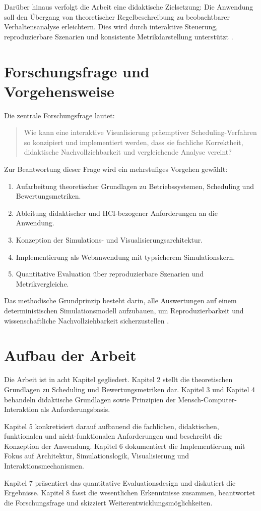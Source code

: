 Darüber hinaus verfolgt die Arbeit eine didaktische Zielsetzung: Die Anwendung soll den Übergang von theoretischer Regelbeschreibung zu beobachtbarer Verhaltensanalyse erleichtern. Dies wird durch interaktive Steuerung, reproduzierbare Szenarien und konsistente Metrikdarstellung unterstützt \cite{hundhausen2002meta,naps2002engagement}.

\section{Forschungsfrage und Vorgehensweise}

Die zentrale Forschungsfrage lautet:

\begin{quote}
    Wie kann eine interaktive Visualisierung präemptiver Scheduling-Verfahren so konzipiert und implementiert werden, dass sie fachliche Korrektheit, didaktische Nachvollziehbarkeit und vergleichende Analyse vereint?
\end{quote}

Zur Beantwortung dieser Frage wird ein mehrstufiges Vorgehen gewählt:

\begin{enumerate}
    \item Aufarbeitung theoretischer Grundlagen zu Betriebssystemen, Scheduling und Bewertungsmetriken.
    \item Ableitung didaktischer und HCI-bezogener Anforderungen an die Anwendung.
    \item Konzeption der Simulations- und Visualisierungsarchitektur.
    \item Implementierung als Webanwendung mit typsicherem Simulationskern.
    \item Quantitative Evaluation über reproduzierbare Szenarien und Metrikvergleiche.
\end{enumerate}

Das methodische Grundprinzip besteht darin, alle Auswertungen auf einem deterministischen Simulationsmodell aufzubauen, um Reproduzierbarkeit und wissenschaftliche Nachvollziehbarkeit sicherzustellen \cite{banks2010discrete}.

\section{Aufbau der Arbeit}

Die Arbeit ist in acht Kapitel gegliedert. Kapitel 2 stellt die theoretischen Grundlagen zu Scheduling und Bewertungsmetriken dar. Kapitel 3 und Kapitel 4 behandeln didaktische Grundlagen sowie Prinzipien der Mensch-Computer-Interaktion als Anforderungsbasis.

Kapitel 5 konkretisiert darauf aufbauend die fachlichen, didaktischen, funktionalen und nicht-funktionalen Anforderungen und beschreibt die Konzeption der Anwendung. Kapitel 6 dokumentiert die Implementierung mit Fokus auf Architektur, Simulationslogik, Visualisierung und Interaktionsmechanismen.

Kapitel 7 präsentiert das quantitative Evaluationsdesign und diskutiert die Ergebnisse. Kapitel 8 fasst die wesentlichen Erkenntnisse zusammen, beantwortet die Forschungsfrage und skizziert Weiterentwicklungsmöglichkeiten.

